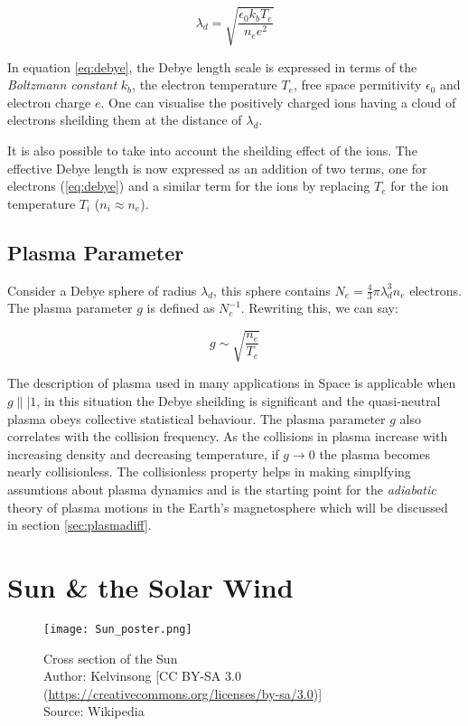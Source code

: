 \begin{equation}\label{eq:debye}
    \lambda_d = \sqrt{\frac{\epsilon_0 k_b T_e}{n_e e^2}}
\end{equation}

In equation \ref{eq:debye}, the Debye length scale is expressed in terms of the \emph{Boltzmann constant} $k_b$, 
the electron temperature $T_e$, free space permitivity $\epsilon_0$ and electron charge $e$. One can visualise the 
positively charged ions having a cloud of electrons sheilding them at the distance of $\lambda_d$. 

It is also possible to take into account the sheilding effect of the ions. The effective Debye length is now 
expressed as an addition of two terms, one for electrons (\ref{eq:debye}) and a similar term for the ions by replacing 
$T_e$ for the ion temperature $T_i$ ($n_i \approx n_e$). 

\subsection*{Plasma Parameter}

Consider a Debye sphere of radius $\lambda_d$, this sphere contains $N_e = \frac{4}{3}\pi \lambda^3_d n_e$ electrons. The 
plasma parameter $g$ is defined as $N_{e}^{-1}$. Rewriting this, we can say:

\begin{equation}
    g \sim \sqrt{\frac{n_e}{T_e}}
\end{equation}

The description of plasma used in many applications in Space is applicable when $g \|| 1$, in this situation the Debye sheilding 
is significant and the quasi-neutral plasma obeys collective statistical behaviour. The plasma parameter $g$ also correlates with 
the collision frequency. As the collisions in plasma increase with increasing density and decreasing temperature, if $g \longrightarrow 0$ 
the plasma becomes nearly collisionless. The collisionless property helps in making simplfying assumtions about plasma dynamics and 
is the starting point for the \emph{adiabatic} theory of plasma motions in the Earth's magnetosphere which will be discussed in section 
\ref{sec:plasmadiff}.

\section{Sun \& the Solar Wind}\label{sec:solar}


\begin{figure}
    \noindent\texttt{[image: Sun\_poster.png]}
    \caption{\small Cross section of the Sun \\ Author: Kelvinsong [CC BY-SA 3.0 (\url{https://creativecommons.org/licenses/by-sa/3.0})] \\ Source: Wikipedia}
    \label{fig:SunLayers}
\end{figure}

